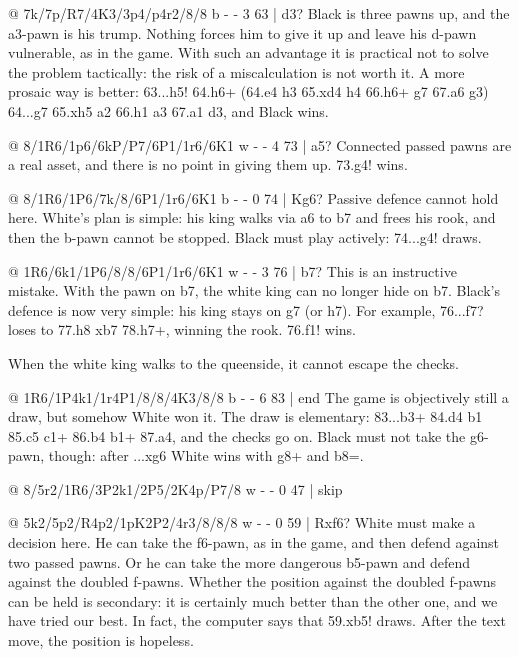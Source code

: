 @ 7k/7p/R7/4K3/3p4/p4r2/8/8 b - - 3 63 | d3?
Black is three pawns up, and the a3-pawn is his trump. Nothing forces him to give it up and leave
his d-pawn vulnerable, as in the game. With such an advantage it is practical not to solve the
problem tactically: the risk of a miscalculation is not worth it. A more prosaic way is better:
63...h5! 64.\R h6+ (64.\K e4 \R h3 65.\K xd4 h4 66.\R h6+ \K g7 67.\R a6 \R g3) 64...\K g7
65.\R xh5 a2 66.\R h1 \R a3 67.\R a1 d3, and Black wins.

@ 8/1R6/1p6/6kP/P7/6P1/1r6/6K1 w - - 4 73 | a5?
Connected passed pawns are a real asset, and there is no point in giving them up. 73.g4! wins.

@ 8/1R6/1P6/7k/8/6P1/1r6/6K1 b - - 0 74 | Kg6?
Passive defence cannot hold here. White's plan is simple: his
king walks via a6 to b7 and frees his rook, and then the b-pawn cannot be stopped. Black must play
actively: 74...\K g4! draws.

@ 1R6/6k1/1P6/8/8/6P1/1r6/6K1 w - - 3 76 | b7?
This is an instructive mistake. With the pawn on b7, the white king can no longer hide on b7.
Black's defence is now very simple: his king stays on g7 (or h7). For example, 76...\K f7? loses to
77.\R h8 \R xb7 78.\R h7+, winning the rook. 76.\K f1! wins.

When the white king walks to the queenside, it cannot escape the checks.

@ 1R6/1P4k1/1r4P1/8/8/4K3/8/8 b - - 6 83 | end
The game is objectively still a draw, but somehow White won it. The draw is elementary:
83...\R b3+ 84.\K d4 \R b1 85.\K c5 \R c1+ 86.\K b4 \R b1+ 87.\K a4, and the checks go on. Black
must not take the g6-pawn, though: after ...\K xg6 White wins with \R g8+ and b8=\Q.

@ 8/5r2/1R6/3P2k1/2P5/2K4p/P7/8 w - - 0 47 | skip

@ 5k2/5p2/R4p2/1pK2P2/4r3/8/8/8 w - - 0 59 | Rxf6?
White must make a decision here. He can take the f6-pawn, as in the game, and then defend
against two passed pawns. Or he can take the more dangerous b5-pawn and defend against the
doubled f-pawns. Whether the position against the doubled f-pawns can be held is secondary:
it is certainly much better than the other one, and we have tried our best. In fact, the
computer says that 59.\K xb5! draws. After the text move, the position is hopeless.

